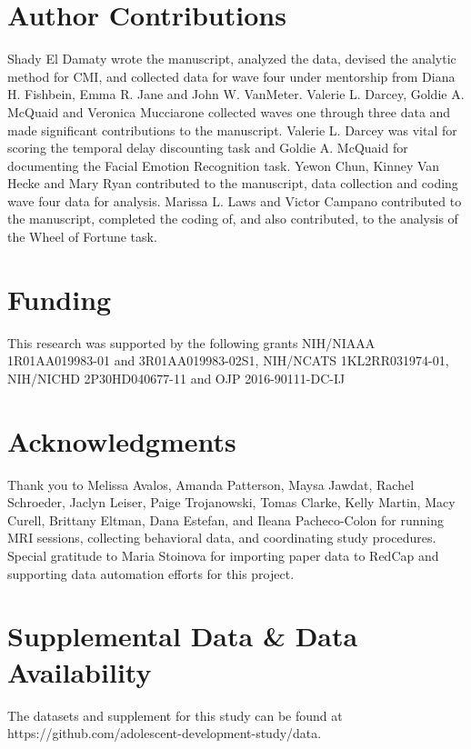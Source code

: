 \documentclass[utf8]{frontiersSCNS} %
\begin{document}
\section*{Author Contributions}
Shady El Damaty wrote the manuscript, analyzed the data, devised the analytic method for CMI, and collected data for wave four under mentorship from Diana H. Fishbein, Emma R. Jane and John W. VanMeter. Valerie L. Darcey, Goldie A. McQuaid and Veronica Mucciarone collected waves one through three data and made significant contributions to the manuscript. Valerie L. Darcey was vital for scoring the temporal delay discounting task and Goldie A. McQuaid for documenting the Facial Emotion Recognition task. Yewon Chun, Kinney Van Hecke and Mary Ryan contributed to the manuscript, data collection and coding wave four data for analysis. Marissa L. Laws and Victor Campano contributed to the manuscript, completed the coding of, and also contributed, to the analysis of the Wheel of Fortune task.

\section*{Funding}
This research was supported by the following grants NIH/NIAAA 1R01AA019983-01 and 3R01AA019983-02S1, NIH/NCATS 1KL2RR031974-01, 
NIH/NICHD 2P30HD040677-11 and OJP 2016-90111-DC-IJ


\section*{Acknowledgments}
Thank you to Melissa Avalos, Amanda Patterson, Maysa Jawdat, Rachel Schroeder, Jaclyn Leiser, Paige Trojanowski, Tomas Clarke, Kelly Martin, Macy Curell, Brittany Eltman, Dana Estefan, and Ileana Pacheco-Colon for running MRI sessions, collecting behavioral data, and coordinating study procedures. Special gratitude to Maria Stoinova for importing paper data to RedCap and supporting data automation efforts for this project.

\section*{Supplemental Data \& Data Availability}
The datasets and supplement for this study can be found at https://github.com/adolescent-development-study/data.
\newpage
\end{document}

